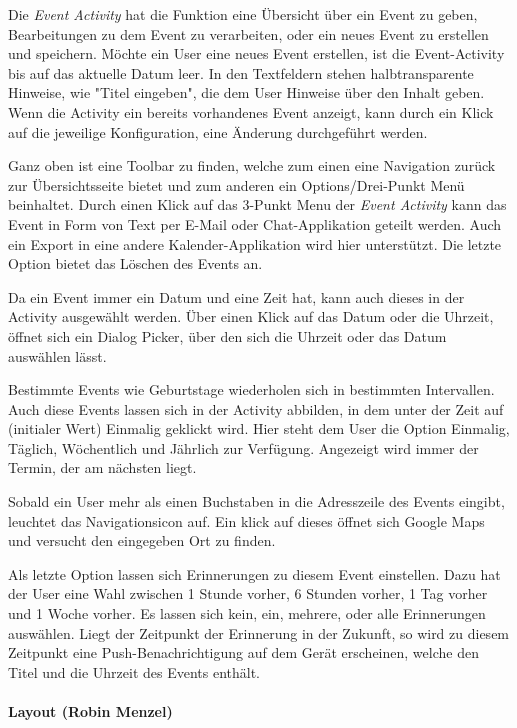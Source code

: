 Die \textit{Event Activity} hat die Funktion eine Übersicht über ein Event zu geben, Bearbeitungen zu dem Event zu verarbeiten, oder ein neues Event zu erstellen und speichern. Möchte ein User eine neues Event erstellen, ist die Event-Activity bis auf das aktuelle Datum leer. In den Textfeldern stehen halbtransparente Hinweise, wie "Titel eingeben", die dem User Hinweise über den Inhalt geben. Wenn die Activity ein bereits vorhandenes Event anzeigt, kann durch ein Klick auf die jeweilige Konfiguration, eine Änderung durchgeführt werden.

Ganz oben ist eine Toolbar zu finden, welche zum einen eine Navigation zurück zur Übersichtsseite bietet und zum anderen ein Options/Drei-Punkt Menü beinhaltet. Durch einen Klick auf das 3-Punkt Menu der \textit{Event Activity}  kann das Event in Form von Text per E-Mail oder Chat-Applikation geteilt werden. Auch ein Export in eine andere Kalender-Applikation wird hier unterstützt. Die letzte Option bietet das Löschen des Events an.

Da ein Event immer ein Datum und eine Zeit hat, kann auch dieses in der Activity ausgewählt werden. Über einen Klick auf das Datum oder die Uhrzeit, öffnet sich ein Dialog Picker, über den sich die Uhrzeit oder das Datum auswählen lässt.

Bestimmte Events wie Geburtstage wiederholen sich in bestimmten Intervallen. Auch diese Events lassen sich in der Activity abbilden, in dem unter der Zeit auf (initialer Wert) Einmalig geklickt wird. Hier steht dem User die Option Einmalig, Täglich, Wöchentlich und Jährlich zur Verfügung. Angezeigt wird immer der Termin, der am nächsten liegt.

Sobald ein User mehr als einen Buchstaben in die Adresszeile des Events eingibt, leuchtet das Navigationsicon auf. Ein klick auf dieses öffnet sich Google Maps und versucht den eingegeben Ort zu finden.

Als letzte Option lassen sich Erinnerungen zu diesem Event einstellen. Dazu hat der User eine Wahl zwischen 1 Stunde vorher, 6 Stunden vorher, 1 Tag vorher und 1 Woche vorher. Es lassen sich kein, ein, mehrere, oder alle Erinnerungen auswählen. Liegt der Zeitpunkt der Erinnerung in der Zukunft, so wird zu diesem Zeitpunkt eine Push-Benachrichtigung auf dem Gerät erscheinen, welche den Titel und die Uhrzeit des Events enthält.

\paragraph{Layout (Robin Menzel)}

